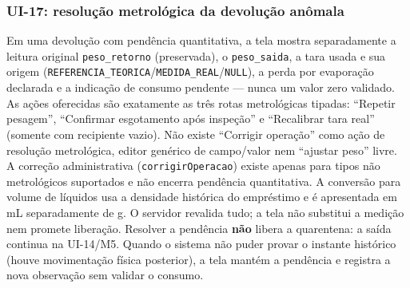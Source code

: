 \subsubsection{UI-17: resolução metrológica da devolução anômala}
Em uma devolução com pendência quantitativa, a tela mostra separadamente a leitura original \texttt{peso\_retorno} (preservada), o \texttt{peso\_saida}, a tara usada e sua origem (\texttt{REFERENCIA\_TEORICA}/\texttt{MEDIDA\_REAL}/\texttt{NULL}), a perda por evaporação declarada e a indicação de consumo pendente — nunca um valor zero validado. As ações oferecidas são exatamente as três rotas metrológicas tipadas: ``Repetir pesagem'', ``Confirmar esgotamento após inspeção'' e ``Recalibrar tara real'' (somente com recipiente vazio). Não existe ``Corrigir operação'' como ação de resolução metrológica, editor genérico de campo/valor nem ``ajustar peso'' livre. A correção administrativa (\texttt{corrigirOperacao}) existe apenas para tipos não metrológicos suportados e não encerra pendência quantitativa. A conversão para volume de líquidos usa a densidade histórica do empréstimo e é apresentada em mL separadamente de g. O servidor revalida tudo; a tela não substitui a medição nem promete liberação. Resolver a pendência \textbf{não} libera a quarentena: a saída continua na UI-14/M5. Quando o sistema não puder provar o instante histórico (houve movimentação física posterior), a tela mantém a pendência e registra a nova observação sem validar o consumo.

